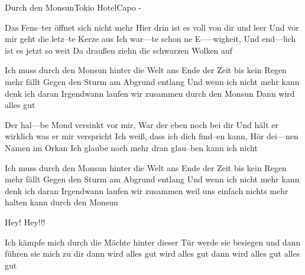 \begin{song}{Durch den Monsun}{Tokio Hotel}{Capo -}

Das Fens--ter öffnet sich  nicht mehr 
Hier drin ist es voll von dir   und leer
Und vor mir geht die letz--te Kerze aus
Ich war---te schon ne E-----wigkeit, Und end---lich ist es jetzt so weit
Da draußen ziehn die schwarzen Wolken auf

Ich muss durch den Monsun hinter die Welt
ans Ende der Zeit bis kein Regen mehr fällt
Gegen den Sturm am Abgrund entlang
Und wenn ich nicht mehr kann denk ich daran
Irgendwann laufen wir zusammen durch den Monsun
Dann wird alles gut

Der hal---be Mond versinkt vor mir, War   der eben noch  bei dir
Und hält er wirklich was   er mir verspricht
Ich weiß,  dass ich dich find--en kann, Hör dei---nen Namen im    Orkan
Ich glaube noch mehr dran glau--ben kann ich nicht

Ich muss durch den Monsun hinter die Welt
ans Ende der Zeit bis kein Regen mehr fällt
Gegen den Sturm am Abgrund entlang
Und wenn ich nicht mehr kann denk ich daran
Irgendwann laufen wir zusammen weil uns einfach nichts mehr halten kann
durch den Monsun

Hey!
Hey!!!

Ich kämpfe mich durch die Mächte hinter dieser Tür
werde sie besiegen und dann führen sie mich zu dir
dann wird alles gut
wird alles gut
dann wird alles gut
alles gut


\end{song}

